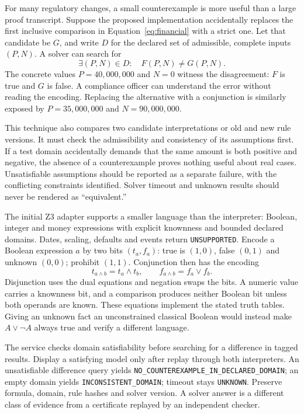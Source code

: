 \documentclass[12pt,a4paper,oneside,openany]{book}
\begin{document}
For many regulatory changes, a small counterexample is more useful than a large
proof transcript. Suppose the proposed implementation accidentally replaces the
first inclusive comparison in Equation~\eqref{eq:financial} with a strict one.
Let that candidate be $G$, and write $D$ for the declared set of admissible,
complete inputs $(P,N)$. A solver can search for
\begin{equation}
 \exists (P,N)\in D:\quad F(P,N)\ne G(P,N).
 \label{eq:counterexample}
\end{equation}
The concrete values $P=40{,}000{,}000$ and $N=0$ witness the disagreement:
$F$ is true and $G$ is false. A compliance officer can understand the error
without reading the encoding. Replacing the alternative with a conjunction is
similarly exposed by $P=35{,}000{,}000$ and $N=90{,}000{,}000$.

This technique also compares two candidate interpretations or old and new rule
versions. It must check the admissibility and consistency of its assumptions
first. If a test domain accidentally demands that the same amount is both
positive and negative, the absence of a counterexample proves nothing useful
about real cases. Unsatisfiable assumptions should be reported as a separate
failure, with the conflicting constraints identified. Solver timeout and unknown
results should never be rendered as ``equivalent.''

The initial Z3 adapter supports a smaller language than the interpreter:
Boolean, integer and money expressions with explicit knownness and bounded
declared domains. Dates, scaling, defaults and events return
\texttt{UNSUPPORTED}. Encode a Boolean expression $a$ by two bits $(t_a,f_a)$:
true is $(1,0)$, false $(0,1)$ and unknown $(0,0)$; prohibit $(1,1)$.
Conjunction then has the encoding
\begin{equation}
 t_{a\land b}=t_a\land t_b,\qquad
 f_{a\land b}=f_a\lor f_b.
 \label{eq:knownness}
\end{equation}
Disjunction uses the dual equations and negation swaps the bits. A numeric value
carries a knownness bit, and a comparison produces neither Boolean bit unless
both operands are known. These equations implement the stated truth tables.
Giving an unknown fact an unconstrained classical Boolean would instead make
$A\lor\neg A$ always true and verify a different language.

The service checks domain satisfiability before searching for a difference in
tagged results. Display a satisfying model only after replay through both
interpreters. An unsatisfiable difference query yields
\texttt{NO\_COUNTEREXAMPLE\_IN\_DECLARED\_DOMAIN}; an empty domain yields
\texttt{INCONSISTENT\_DOMAIN}; timeout stays \texttt{UNKNOWN}. Preserve formula,
domain, rule hashes and solver version. A solver answer is a different class
of evidence from a certificate replayed by an independent checker.
\end{document}
